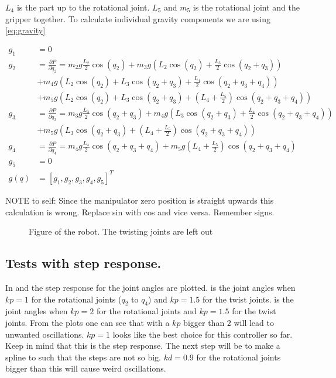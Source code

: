      $L_4$ is the part up to the rotational joint. $L_5$ and $m_5$ is the rotational joint and the gripper together. To calculate individual gravity components we are using \eqref{eq:gravity}

     \begin{align*}
        g_1 &= 0
        \\
        g_2 &= \frac{\partial P}{\partial q_2} = 
        m_2g\frac{L_2}{2}\cos{(q_2)}+
        m_3g\left( L_2 \cos{(q_2)} + \frac{L_3}{2}\cos{(q_2+q_3)} \right)\\&+
        m_4g\left( L_2 \cos{(q_2)} + L_3\cos{(q_2 + q_3)} + \frac{L_4}{2}\cos{(q_2+q_3+q_4)} \right)\\&+
        m_5g\left( L_2 \cos{(q_2)} + L_3\cos{(q_2 + q_3)} + \left(L_4 + \frac{L_5}{2} \right)\cos{(q_2+q_3+q_4)} \right)
        \\
        g_3 &= \frac{\partial P}{\partial q_3} =
        m_3g\frac{L_3}{2}\cos{(q_2+q_3)} +
        m_4g\left( L_3\cos{(q_2 + q_3)} + \frac{L_4}{2}\cos{(q_2+q_3+q_4)} \right)\\&+
        m_5g\left(  L_3\cos{(q_2 + q_3)} + \left(L_4 + \frac{L_5}{2} \right)\cos{(q_2+q_3+q_4)} \right)
        \\
        g_4 &=\frac{\partial P}{\partial q_4} = 
        m_4g\frac{L_4}{2}\cos{(q_2+q_3+q_4)}+
        m_5g\left(L_4 + \frac{L_5}{2} \right)\cos{(q_2+q_3+q_4)}
        \\
        g_5 &= 0
        \\
        g(q) &= [g_1,g_2,g_3,g_4,g_5]^T
     \end{align*}

NOTE to self: Since the manipulator zero position is straight upwards this calculation is wrong. Replace sin with cos and vice versa. Remember signs. 

\begin{figure}[htbp]
    \centering
    
    \caption{Figure of the robot. The twisting joints are left out}
    \label{draw:pot-rob}
\end{figure}


\subsection*{Tests with step response.}
In  and  the step response for the joint angles are plotted.  is the joint angles when $kp = 1$ for the rotational joints ($q_2$ to $q_4$) and $kp = 1.5$ for the twist joints.   is the joint angles when $kp = 2$ for the rotational joints and $kp = 1.5$ for the twist joints. From the plots one can see that with a $kp$ bigger than $2$ will lead to unwanted oscillations. $kp = 1$ looks like the best choice for this controller so far. Keep in mind that this is the step response. The next step will be to make a spline to such that the steps are not so big. $kd = 0.9$ for the rotational joints bigger than this will cause weird oscillations.

